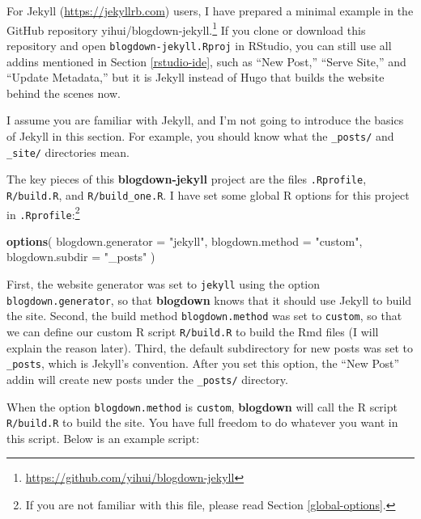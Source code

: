 \documentclass[12pt,]{krantz}
\makeatletter
\newenvironment{Shaded}{\begin{snugshade}}{\end{snugshade}}
\newcommand{\KeywordTok}[1]{\textcolor[rgb]{0.13,0.29,0.53}{\textbf{#1}}}
\newcommand{\DataTypeTok}[1]{\textcolor[rgb]{0.13,0.29,0.53}{#1}}
\newcommand{\StringTok}[1]{\textcolor[rgb]{0.31,0.60,0.02}{#1}}
\newcommand{\NormalTok}[1]{#1}
\renewcommand{\href}[2]{#2\footnote{\url{#1}}}
\newenvironment{kframe}{%
\medskip{}
\setlength{\fboxsep}{.8em}
 \def\at@end@of@kframe{}%
 \ifinner\ifhmode%
  \def\at@end@of@kframe{\end{minipage}}%
  \begin{minipage}{\columnwidth}%
 \fi\fi%
 \def\FrameCommand##1{\hskip\@totalleftmargin \hskip-\fboxsep
 \colorbox{shadecolor}{##1}\hskip-\fboxsep
     \hskip-\linewidth \hskip-\@totalleftmargin \hskip\columnwidth}%
 \MakeFramed {\advance\hsize-\width
   \@totalleftmargin\z@ \linewidth\hsize
   \@setminipage}}%
 {\par\unskip\endMakeFramed%
 \at@end@of@kframe}
\renewenvironment{Shaded}{\begin{kframe}}{\end{kframe}}
\theoremstyle{definition}
\theoremstyle{definition}
\theoremstyle{definition}
\theoremstyle{remark}
\makeatother
\begin{document}
For Jekyll (\url{https://jekyllrb.com}) users, I have
prepared a minimal example in the GitHub repository
\href{https://github.com/yihui/blogdown-jekyll}{yihui/blogdown-jekyll.}
If you clone or download this repository and open
\texttt{blogdown-jekyll.Rproj} in RStudio, you can still use all addins
mentioned in Section \ref{rstudio-ide}, such as ``New Post,'' ``Serve
Site,'' and ``Update Metadata,'' but it is Jekyll instead of Hugo that
builds the website behind the scenes now.

I assume you are familiar with Jekyll, and I'm not going to introduce
the basics of Jekyll in this section. For example, you should know what
the \texttt{\_posts/} and \texttt{\_site/} directories mean.

The key pieces of this \textbf{blogdown-jekyll} project are the files
\texttt{.Rprofile}, \texttt{R/build.R}, and \texttt{R/build\_one.R}. I
have set some global R options for this project in
\texttt{.Rprofile}:\footnote{If you are not familiar with this file,
  please read Section \ref{global-options}.}

\begin{Shaded}
\begin{Highlighting}[]
\KeywordTok{options}\NormalTok{(}
  \DataTypeTok{blogdown.generator =} \StringTok{"jekyll"}\NormalTok{,}
  \DataTypeTok{blogdown.method =} \StringTok{"custom"}\NormalTok{,}
  \DataTypeTok{blogdown.subdir =} \StringTok{"_posts"}
\NormalTok{)}
\end{Highlighting}
\end{Shaded}

First, the website generator was set to \texttt{jekyll} using the option
\texttt{blogdown.generator}, so that \textbf{blogdown} knows that it
should use Jekyll to build the site. Second, the build method
\texttt{blogdown.method} was set to \texttt{custom}, so that we can
define our custom R script \texttt{R/build.R} to build the Rmd files (I
will explain the reason later). Third, the default subdirectory for new
posts was set to \texttt{\_posts}, which is Jekyll's convention. After
you set this option, the ``New Post'' addin will create new posts under
the \texttt{\_posts/} directory.

When the option \texttt{blogdown.method} is \texttt{custom},
\textbf{blogdown} will call the R script \texttt{R/build.R} to build the
site. You have full freedom to do whatever you want in this script.
Below is an example script:
\end{document}
